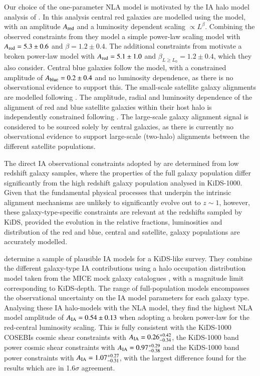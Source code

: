 \begin{appendix}
{Our choice of the one-parameter NLA model is motivated by the IA halo model analysis of \citet{fortuna/etal:2020}.   In this analysis central red galaxies are modelled using the  \citet{hirata/seljak:2004} model, with an amplitude $A_{\rm red}$ and a luminosity dependent scaling $\propto L^\beta$.   Combining the observed constraints from \citet{joachimi/etal:2011, singh/etal:2015} they model a simple power-law scaling model with $A_{\rm red} = 5.3 \pm 0.6$ and $\beta=1.2 \pm 0.4$.   The additional constraints from \citet{johnston/etal:2019} motivate a broken power-law model with $A_{\rm red} = 5.1 \pm 1.0$ and $\beta_{L \geq L_0}=1.2 \pm 0.4$, which they also consider.    Central blue galaxies follow the \citet{hirata/seljak:2004} model, with a \citet{johnston/etal:2019} constrained amplitude of $A_{\rm blue} = 0.2 \pm 0.4$ and no luminosity dependence, as there is no observational evidence to support this.    The small-scale satellite galaxy alignments are modelled following \citet{schneider/bridle:2010}.  The amplitude, radial and luminosity dependence of the alignment of red and blue satellite galaxies within their host halo is independently constrained following \citet{georgiou/etal:2019}.     The large-scale galaxy alignment signal is considered to be sourced solely by central galaxies, as there is currently no observational evidence to support large-scale (two-halo) alignments between the different satellite populations.

The direct IA observational constraints adopted by \citet{fortuna/etal:2020} are determined from low redshift galaxy samples, where the properties of the full galaxy population differ significantly from the high redshift galaxy population analysed in KiDS-1000.  Given that the fundamental physical processes that underpin the intrinsic alignment mechanisms are unlikely to significantly evolve out to $z \sim 1$, however, these galaxy-type-specific constraints are relevant at the redshifts sampled by KiDS, provided the evolution in the relative fractions, luminosities and distribution of the red and blue, central and satellite, galaxy populations are accurately modelled.   

\citet{fortuna/etal:2020} determine a sample of plausible IA models for a KiDS-like survey.  They combine the different galaxy-type IA contributions using a halo occupation distribution model taken from the MICE mock galaxy catalogues \citep{fosalba/etal:2015}, with a magnitude limit corresponding to KiDS-depth.   The range of full-population models encompasses the observational uncertainty on the IA model parameters for each galaxy type.    Analysing these IA halo-models with the NLA model, they find the highest NLA model amplitude of $A_{\rm IA}=0.54 \pm 0.13$ when adopting a broken power-law for the red-central luminosity scaling.    This is fully consistent with the \citet{asgari/etal:2020} KiDS-1000 COSEBIs cosmic shear constraints with $A_{\rm IA}=0.26 ^{+0.42}_{-0.34}$, the KiDS-1000 band power cosmic shear constraints with $A_{\rm IA}=0.97 ^{+0.29}_{-0.38}$ and the KiDS-1000 \tttp band power constraints with $A_{\rm IA}=1.07^{+0.27}_{-0.31}$, with the largest difference found for the \tttp results which are in 1.6$\sigma$ agreement.    

}
\end{appendix}

